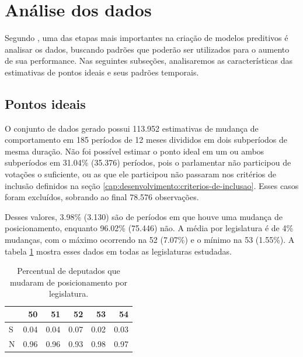 \documentclass[a4paper,titlepage]{ppgi}\usepackage[]{graphicx}\usepackage[]{color}
\newenvironment{knitrout}{}{} %
\begin{document}
\section{Análise dos dados}
\label{cap:desenvolvimento:analise}

Segundo , uma das etapas mais importantes na criação de
modelos preditivos é analisar os dados, buscando padrões que poderão ser
utilizados para o aumento de sua performance. Nas seguintes subseções,
analisaremos as características das estimativas de pontos ideais e seus padrões
temporais.

\subsection{Pontos ideais}



O conjunto de dados gerado possui 113.952 estimativas de mudança
de comportamento em 185 períodos de 12 meses divididos em dois
subperíodos de mesma duração. Não foi possível estimar o ponto ideal em um ou
ambos subperíodos em 31.04\%
(35.376) períodos, pois o parlamentar não participou de
votações o suficiente, ou as que ele participou não passaram nos critérios de
inclusão definidos na seção \ref{cap:desenvolvimento:criterios-de-inclusao}. Esses casos
foram excluídos, sobrando ao final 78.576 observações.

Desses valores, 3.98\%
(3.130) são de períodos em que houve uma mudança de
posicionamento, enquanto 96.02\% (75.446) não. A média por legislatura é de
4\% mudanças,
com o máximo ocorrendo na 52\textordfeminine{}
(7.07\%) e o
mínimo na 53\textordfeminine{}
(1.55\%).  A
tabela \ref{table:coalition-changes-per-legislature} mostra esses dados em
todas as legislaturas estudadas.

\begin{table}
\centering
\begin{knitrout}
\color{fgcolor}
\begin{tabular}{l|r|r|r|r|r}
\hline
  & 50 & 51 & 52 & 53 & 54\\
\hline
S & 0.04 & 0.04 & 0.07 & 0.02 & 0.03\\
\hline
N & 0.96 & 0.96 & 0.93 & 0.98 & 0.97\\
\hline
\end{tabular}


\end{knitrout}
\caption{Percentual de deputados que mudaram de posicionamento por legislatura.}
\label{table:coalition-changes-per-legislature}
\end{table}
\end{document}
